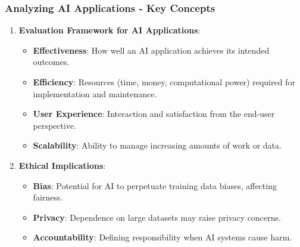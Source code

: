 \documentclass[aspectratio=169]{beamer}
\begin{document}
\begin{frame}[fragile]
    \frametitle{Analyzing AI Applications - Key Concepts}
    \begin{enumerate}
        \item \textbf{Evaluation Framework for AI Applications}:
        \begin{itemize}
            \item \textbf{Effectiveness}: How well an AI application achieves its intended outcomes.
            \item \textbf{Efficiency}: Resources (time, money, computational power) required for implementation and maintenance.
            \item \textbf{User Experience}: Interaction and satisfaction from the end-user perspective.
            \item \textbf{Scalability}: Ability to manage increasing amounts of work or data.
        \end{itemize}
        
        \item \textbf{Ethical Implications}:
        \begin{itemize}
            \item \textbf{Bias}: Potential for AI to perpetuate training data biases, affecting fairness.
            \item \textbf{Privacy}: Dependence on large datasets may raise privacy concerns.
            \item \textbf{Accountability}: Defining responsibility when AI systems cause harm.
        \end{itemize}
    \end{enumerate}
\end{frame}
\end{document}
